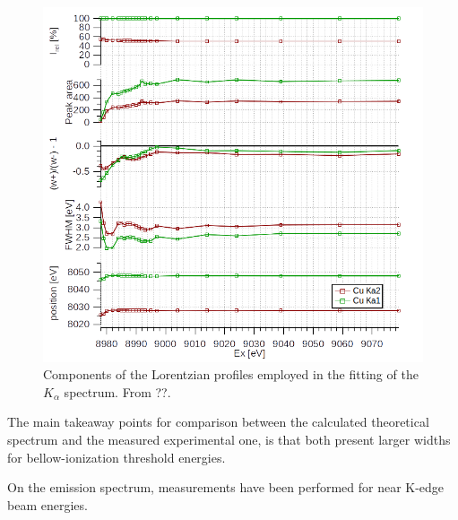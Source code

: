 \begin{figure}
    \includegraphics[width=\linewidth]{Chapters/Figures/Chapter5/ito.png}
    \caption{Components of the Lorentzian profiles employed in the fitting of the $K_{\alpha}$ spectrum. From ??.}\label{fig:ito}
\end{figure}


The main takeaway points for comparison between the calculated theoretical spectrum and the measured experimental one, is that both present larger widths for bellow-ionization threshold energies.










On the emission spectrum, measurements have been performed for near K-edge beam energies.